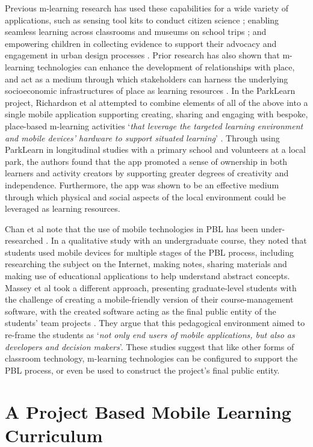 \documentclass[,hyphens]{sigchi}
\begin{document}
Previous m-learning research has used these capabilities for a wide variety of applications, such as sensing tool kits to conduct citizen science \cite{Sharples2017}; enabling seamless learning across classrooms and museums on school trips \cite{Vavoula2009}; and empowering children in collecting evidence to support their advocacy and engagement in urban design processes \cite{Peacock2018}. Prior research has also shown that m-learning technologies can enhance the development of relationships with place, and act as a medium through which stakeholders can harness the underlying socioeconomic infrastructures of place as learning resources \cite{Richardson2017}. In the ParkLearn project, Richardson et al attempted to combine elements of all of the above into a single mobile application supporting creating, sharing and engaging with bespoke, place-based m-learning activities `\textit{that leverage the targeted learning environment and mobile devices' hardware to support situated learning}' \cite{Richardson2018}. Through using ParkLearn in longitudinal studies with a primary school and volunteers at a local park, the authors found that the app promoted a sense of ownership in both learners and activity creators by supporting greater degrees of creativity and independence. Furthermore, the app was shown to be an effective medium through which physical and social aspects of the local environment could be leveraged as learning resources.

Chan et al note that the use of mobile technologies in PBL has been under-researched \cite{Chan2015}. In a qualitative study with an undergraduate course, they noted that students used mobile devices for multiple stages of the PBL process, including researching the subject on the Internet, making notes, sharing materials and making use of educational applications to help understand abstract concepts. Massey et al took a different approach, presenting graduate-level students with the challenge of creating a mobile-friendly version of their course-management software, with the created software acting as the final public entity of the students' team projects \cite{Massey2006}. They argue that this pedagogical environment aimed to re-frame the students as `\textit{not only end users of mobile applications, but also as developers and decision makers}'. These studies suggest that like other forms of classroom technology, m-learning technologies can be configured to support the PBL process, or even be used to construct the project's final public entity.

\section{A Project Based Mobile Learning Curriculum}
\end{document}
